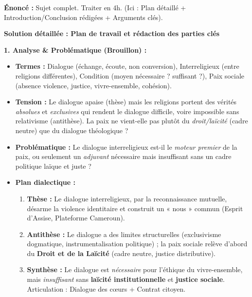 \documentclass[11pt]{article}
\begin{document}
\begin{exoresolu}
\textbf{Énoncé :} Sujet complet. Traiter en 4h. (Ici : Plan détaillé + Introduction/Conclusion rédigées + Arguments clés).

\tcblower
\textbf{Solution détaillée : Plan de travail et rédaction des parties clés}

\textbf{1. Analyse \& Problématique (Brouillon) :}
\begin{itemize}
    \item \textbf{Termes :} Dialogue (échange, écoute, non conversion), Interreligieux (entre religions différentes), Condition (moyen nécessaire ? suffisant ?), Paix sociale (absence violence, justice, vivre-ensemble, cohésion).
    \item \textbf{Tension :} Le dialogue apaise (thèse) mais les religions portent des vérités \emph{absolues} et \emph{exclusives} qui rendent le dialogue difficile, voire impossible sans relativisme (antithèse). La paix ne vient-elle pas plutôt du \emph{droit/laïcité} (cadre neutre) que du dialogue théologique ?
    \item \textbf{Problématique :} Le dialogue interreligieux est-il le \emph{moteur premier} de la paix, ou seulement un \emph{adjuvant} nécessaire mais insuffisant sans un cadre politique laïque et juste ?
    \item \textbf{Plan dialectique :}
    \begin{enumerate}
        \item \textbf{Thèse :} Le dialogue interreligieux, par la reconnaissance mutuelle, désarme la violence identitaire et construit un « nous » commun (Esprit d'Assise, Plateforme Cameroun).
        \item \textbf{Antithèse :} Le dialogue a des limites structurelles (exclusivisme dogmatique, instrumentalisation politique) ; la paix sociale relève d'abord du \textbf{Droit et de la Laïcité} (cadre neutre, justice distributive).
        \item \textbf{Synthèse :} Le dialogue est \emph{nécessaire} pour l'éthique du vivre-ensemble, mais \emph{insuffisant} sans \textbf{laïcité institutionnelle} et \textbf{justice sociale}. Articulation : Dialogue des cœurs + Contrat citoyen.
    \end{enumerate}
\end{itemize}


\end{exoresolu}
\end{document}
